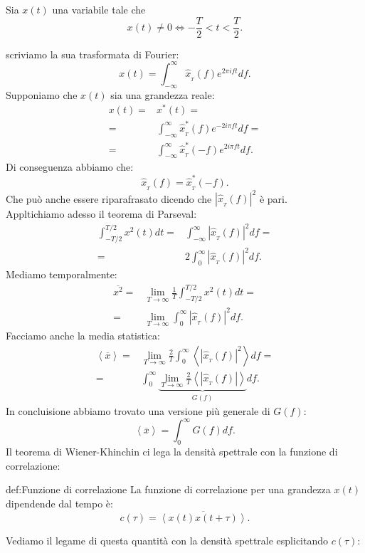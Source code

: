 Sia $x( t) $ una variabile tale che
\[
	x(t) \neq 0 \Longleftrightarrow - \frac{T}{2}<t<\frac{T}{2}
.\] 

scriviamo la sua trasformata di Fourier:
\[
	x( t) 
	=
	\int_{-\infty}^{\infty} \hat{x}_{_T}(f) e^{2\pi i f t} df
.\] 
Supponiamo che $x(t)$ sia una grandezza reale:
\[\begin{aligned}
	x( t) 
	=&
	x^*( t)=\\
	=& 
	\int_{-\infty}^{\infty} \hat{x}^*_{_T} ( f) e^{-2i\pi f t}df=\\
	=&
	\int_{-\infty}^{\infty} \hat{x}^*_{_T} ( -f) e^{2i\pi f t}df
.\end{aligned}\]
Di conseguenza abbiamo che:
\[
	\hat{x}_{_T}(f)=\hat{x}^*_{_T}(-f)
.\] 
Che può anche essere riparafrasato dicendo che $\left| \hat{x}_{_T}(f) \right|^2$ è pari.\\
Appltichiamo adesso il teorema di Parseval:
\[\begin{aligned}
	\int_{-T/2}^{T/2}x^2(t)dt
	=&
	\int_{-\infty}^{\infty} \left| \hat{x}_{_T}(f)\right|^2 df =\\
	=&
	2 \int_{0}^{\infty} \left| \hat{x}_{_T}(f)\right|^2df 
.\end{aligned}\]
Mediamo temporalmente:
\[\begin{aligned}
	\overline{x^2}
	=& 
	\lim_{T \to \infty} \frac{1}{T}\int_{- T /2}^{T /2} x^2( t) dt=\\
	=&
	\lim_{T \to \infty} \int_{0}^{\infty}\left|\hat{x}_{_T}(f)\right|^2 df 
.\end{aligned}\]
Facciamo anche la media statistica:
\[\begin{aligned}
	\left< \overline{x} \right> 
	=&
	\lim_{T \to \infty} \frac{2}{T}\int_{0}^{\infty} 
	\left<\left| \hat{x}_{_T}(f) \right|^2\right>df=\\
	=&
	\int_{0}^{\infty}  
	\underbrace{
	\lim_{T \to \infty}\frac{2}{T}
	\left<\left| \hat{x}_{_T}(f) \right| \right>
	}_{G(f)}
	df
.\end{aligned}\]
In concluisione abbiamo trovato una versione più generale di $G(f)$:
\[
	\left<\overline{x} \right> = \int_{0}^{\infty} G( f) df 
.\] 
Il teorema di Wiener-Khinchin ci lega la densità spettrale con la funzione di correlazione:
\begin{defn}{def:Funzione di correlazione}
	La funzione di correlazione per una grandezza $x(t)$ dipendende dal tempo è:
	\[
		c(\tau) = \overline{\left<x(t)x(t+\tau)\right>}
	.\] 
\end{defn}
Vediamo il legame di questa quantità con la densità spettrale esplicitando $c(\tau)$:
